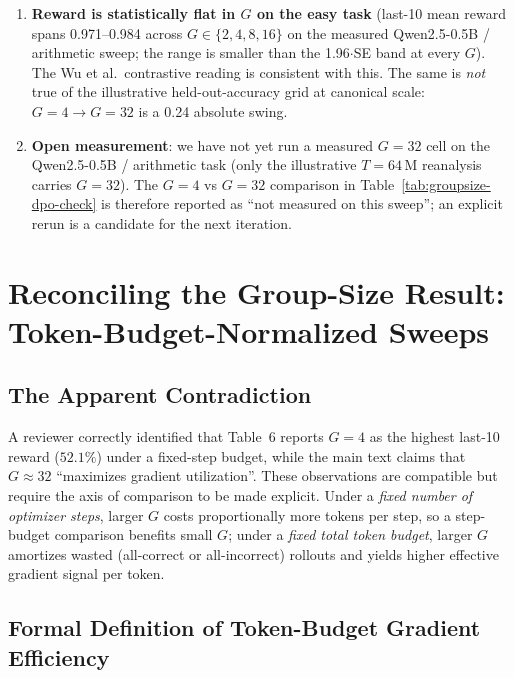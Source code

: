 \documentclass{article}
\begin{document}
\begin{enumerate}
        the budget-dependent optimum is the right hypothesis to test directly.
  \item \textbf{Reward is statistically flat in $G$ on the easy task}
        (last-10 mean reward spans 0.971--0.984 across
        $G \in \{2, 4, 8, 16\}$ on the measured Qwen2.5-0.5B /
        arithmetic sweep; the range is smaller than the 1.96$\cdot$SE
        band at every $G$). The Wu et al.\ contrastive reading is
        consistent with this. The same is \emph{not} true of
        the illustrative held-out-accuracy grid at canonical scale:
        $G{=}4 \to G{=}32$ is a 0.24 absolute swing.
  \item \textbf{Open measurement}: we have not yet run a measured
        $G{=}32$ cell on the Qwen2.5-0.5B / arithmetic task (only the
        illustrative $T{=}64\,$M reanalysis carries $G{=}32$). The
        $G{=}4$ vs $G{=}32$ comparison in
        Table~\ref{tab:groupsize-dpo-check} is therefore reported as
        ``not measured on this sweep''; an explicit rerun is a
        candidate for the next iteration.
\end{enumerate}

 \section{Reconciling the Group-Size Result: Token-Budget-Normalized Sweeps}
\label{sec:appendix:group-size-reconcile}

\subsection{The Apparent Contradiction}

A reviewer correctly identified that Table~6 reports $G{=}4$ as the
highest last-10 reward ($52.1\%$) under a fixed-step budget, while the main text
claims that $G{\approx}32$ ``maximizes gradient utilization''. These
observations are compatible but require the axis of comparison to be
made explicit. Under a \emph{fixed number of optimizer steps}, larger
$G$ costs proportionally more tokens per step, so a step-budget
comparison benefits small $G$; under a \emph{fixed total token budget},
larger $G$ amortizes wasted (all-correct or all-incorrect) rollouts
and yields higher effective gradient signal per token.

\subsection{Formal Definition of Token-Budget Gradient Efficiency}
\end{document}
